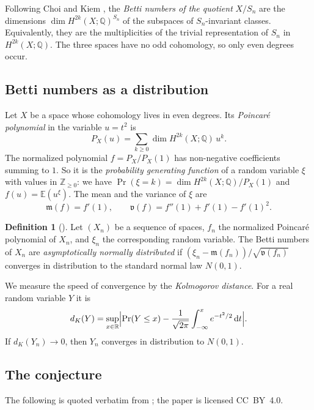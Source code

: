 \documentclass[11pt]{amsart}
\theoremstyle{definition}
\newtheorem*{definition*}{Definition}
\theoremstyle{remark}
\numberwithin{equation}{section}
\newcommand{\RR}{\mathbb{R}}
\newcommand{\ZZ}{\mathbb{Z}}
\newcommand{\QQ}{\mathbb{Q}}
\newcommand{\E}{\mathbb{E}}
\newcommand{\mean}{\mathfrak{m}}
\newcommand{\var}{\mathfrak{v}}
\newcommand{\dd}{\mathrm{d}}
\begin{document}
Following Choi and Kiem \cite[\S5.1]{CK}, the \emph{Betti numbers of the quotient} \(X/S_n\) are the dimensions \(\dim H^{2k}(X;\QQ)^{S_n}\) of the subspaces of \(S_n\)-invariant classes. Equivalently, they are the multiplicities of the trivial representation of \(S_n\) in \(H^{2k}(X;\QQ)\). The three spaces have no odd cohomology, so only even degrees occur.

\subsection{Betti numbers as a distribution}

Let \(X\) be a space whose cohomology lives in even degrees. Its \emph{Poincar\'e polynomial} in the variable \(u=t^2\) is
\[
P_X(u)=\sum_{k\ge0}\dim H^{2k}(X;\QQ)\,u^k .
\]
The normalized polynomial \(f=P_X/P_X(1)\) has non-negative coefficients summing to \(1\). So it is the \emph{probability generating function} of a random variable \(\xi\) with values in \(\ZZ_{\ge0}\): we have \(\Pr(\xi=k)=\dim H^{2k}(X;\QQ)/P_X(1)\) and \(f(u)=\E(u^{\xi})\). The mean and the variance of \(\xi\) are
\begin{equation}\label{eq:meanvar}
\mean(f)=f'(1),\qquad \var(f)=f''(1)+f'(1)-f'(1)^2 .
\end{equation}

\begin{definition*}[{\cite[\S2, the text after Def.~2.1]{CK}}]
Let \((X_n)\) be a sequence of spaces, \(f_n\) the normalized Poincar\'e polynomial of \(X_n\), and \(\xi_n\) the corresponding random variable. The Betti numbers of \(X_n\) are \emph{asymptotically normally distributed} if \((\xi_n-\mean(f_n))/\sqrt{\var(f_n)}\) converges in distribution to the standard normal law \(N(0,1)\).
\end{definition*}

We measure the speed of convergence by the \emph{Kolmogorov distance}. For a real random variable \(Y\) it is
\[
d_K(Y)=\sup_{x\in\RR}\Bigl\lvert \Pr(Y\le x)-\frac{1}{\sqrt{2\pi}}\int_{-\infty}^{x}e^{-t^2/2}\,\dd t\Bigr\rvert .
\]
If \(d_K(Y_n)\to0\), then \(Y_n\) converges in distribution to \(N(0,1)\).

\subsection{The conjecture}

The following is quoted verbatim from \cite[\S5.1]{CK}; the paper is licensed CC~BY~4.0.
\end{document}
